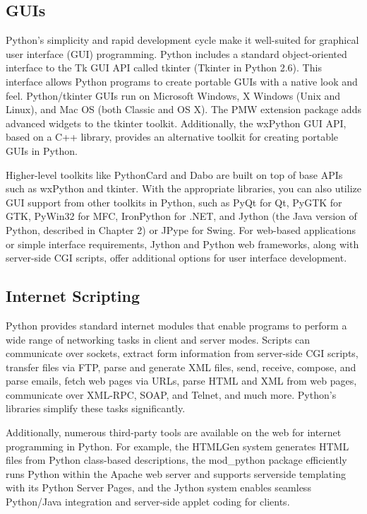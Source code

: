 \documentclass[12pt]{book}
\begin{document}
\subsection{GUIs}

Python's simplicity and rapid development cycle make it well-suited for graphical user interface (GUI) programming. Python includes a standard object-oriented interface to the Tk GUI API called tkinter (Tkinter in Python 2.6). This interface allows Python programs to create portable GUIs with a native look and feel. Python/tkinter GUIs run on Microsoft Windows, X Windows (Unix and Linux), and Mac OS (both Classic and OS X). The PMW extension package adds advanced widgets to the tkinter toolkit. Additionally, the wxPython GUI API, based on a C++ library, provides an alternative toolkit for creating portable GUIs in Python.

Higher-level toolkits like PythonCard and Dabo are built on top of base APIs such as wxPython and tkinter. With the appropriate libraries, you can also utilize GUI support from other toolkits in Python, such as PyQt for Qt, PyGTK for GTK, PyWin32 for MFC, IronPython for .NET, and Jython (the Java version of Python, described in Chapter 2) or JPype for Swing. For web-based applications or simple interface requirements, Jython and Python web frameworks, along with server-side CGI scripts, offer additional options for user interface development.

\subsection{Internet Scripting}

Python provides standard internet modules that enable programs to perform a wide range of networking tasks in client and server modes. Scripts can communicate over sockets, extract form information from server-side CGI scripts, transfer files via FTP, parse and generate XML files, send, receive, compose, and parse emails, fetch web pages via URLs, parse HTML and XML from web pages, communicate over XML-RPC, SOAP, and Telnet, and much more. Python's libraries simplify these tasks significantly.

Additionally, numerous third-party tools are available on the web for internet programming in Python. For example, the HTMLGen system generates HTML files from Python class-based descriptions, the mod\_python package efficiently runs Python within the Apache web server and supports server\dash side templating with its Python Server Pages, and the Jython system enables seamless Python\slash Java integration and server-side applet coding for clients.
\end{document}
